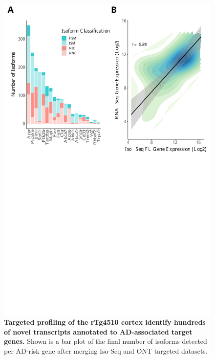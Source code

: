 \newpage
{}
\begin{figure}[]
	\centering
	\includegraphics[page=8,trim={0 26cm 0 0cm},clip,scale = 0.55]{Figures/ONTvsIsoSeq.pdf}
	\captionsetup{width=0.95\textwidth}
	\caption[Merged isoform landscape from Iso-Seq \& ONT targeted profiling]%
	{\textbf{Targeted profiling of the rTg4510 cortex identify hundreds of novel transcripts annotated to AD-associated target genes.} Shown is a bar plot of the final number of isoforms detected per AD-risk gene after merging Iso-Seq and ONT targeted datasets.}
	\label{fig:final_targeted_num}
\end{figure}

